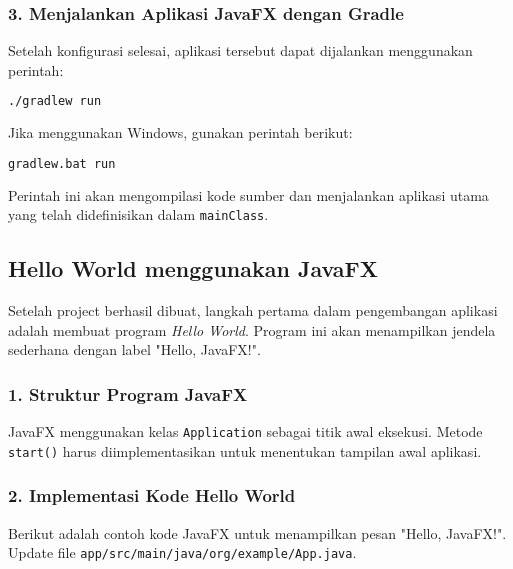 \subsubsection{3. Menjalankan Aplikasi JavaFX dengan Gradle}

Setelah konfigurasi selesai, aplikasi tersebut dapat dijalankan menggunakan perintah:

\begin{lstlisting}[language=bash, caption=Menjalankan aplikasi JavaFX dengan Gradle]
./gradlew run
\end{lstlisting}

Jika menggunakan Windows, gunakan perintah berikut:

\begin{lstlisting}[language=bash, caption=Menjalankan aplikasi proyek Gradle di Windows]
gradlew.bat run
\end{lstlisting}

Perintah ini akan mengompilasi kode sumber dan menjalankan aplikasi utama yang telah didefinisikan dalam \texttt{mainClass}.


\subsection{Hello World menggunakan JavaFX}
\label{hello_world_menggunakan_javafx}

Setelah project berhasil dibuat, langkah pertama dalam pengembangan aplikasi adalah membuat program \textit{Hello World}. Program ini akan menampilkan jendela sederhana dengan label "Hello, JavaFX!".

\subsubsection{1. Struktur Program JavaFX}

JavaFX menggunakan kelas \texttt{Application} sebagai titik awal eksekusi. Metode \texttt{start()} harus diimplementasikan untuk menentukan tampilan awal aplikasi.

\subsubsection{2. Implementasi Kode Hello World}

Berikut adalah contoh kode JavaFX untuk menampilkan pesan "Hello, JavaFX!". Update file \texttt{app/src/main/java/org/example/App.java}.

